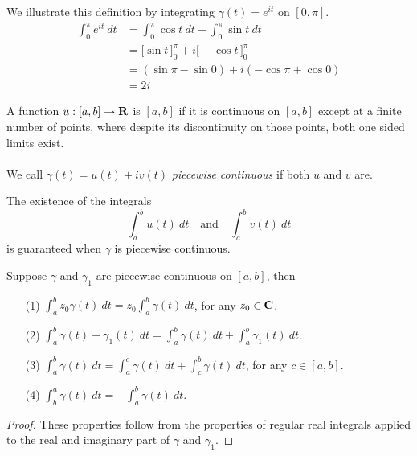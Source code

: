 \medskip

\begin{example}
We illustrate this definition by integrating $\gamma(t) = e^{it}$ on $[0,\pi]$.
\begin{align*}
\int_0^\pi e^{it}\ dt &= \int_0^\pi\cos t\ dt + \int_0^\pi\sin t\ dt\\[1em]
&= \Big[\sin t\,\Big]_0^\pi + i\Big[-\cos t\,\Big]_0^\pi\\[1em]
&= (\sin \pi - \sin 0) + i(-\cos\pi + \cos 0)\\[0.5em]
&= 2i
\end{align*}
\end{example}

\medskip

\begin{definition}
A function $u:[a,b] \to \mathbf R$ is  {\color{darkred}$[a,b]$} if it is continuous on $[a,b]$ except at a finite number of points, where despite its discontinuity on those points, both one sided limits exist.\\
\\
We call $\gamma(t) = u(t) + iv(t)$ \emph{piecewise continuous} if both $u$ and $v$ are. 
\end{definition}

\medskip

\begin{remark}
The existence of the integrals 
\[\int_a^bu(t)\ dt \quad \text{and} \quad \int_a^b v(t)\ dt\]
is guaranteed when $\gamma$ is piecewise continuous.
\end{remark}

\medskip

\begin{proposition}\label{paraint}
Suppose $\gamma$ and $\gamma_1$ are piecewise continuous on $[a,b]$, then
\begin{itemize}[itemsep=0.5em]
\item[(1)] $\displaystyle \int_a^bz_0 \gamma(t)\ dt = z_0\int_a^b\gamma(t)\ dt$, for any $z_0 \in \mathbf C$.
\item[(2)] $\displaystyle \int_a^b \gamma(t) + \gamma_1(t)\ dt = \int_a^b\gamma(t)\ dt + \int_a^b\gamma_1(t)\ dt$.
\item[(3)] $\displaystyle \int_a^b \gamma(t)\ dt = \int_a^c\gamma(t)\ dt + \int_c^b\gamma(t)\ dt$, for any $c \in [a,b]$.
\item[(4)] $\displaystyle \int_b^a \gamma(t)\ dt = -\int_a^b\gamma(t)\ dt$.
\end{itemize}
\end{proposition}
\begin{proof}
These properties follow from the properties of regular real integrals applied to the real and imaginary part of $\gamma$ and $\gamma_1$.
\end{proof}

